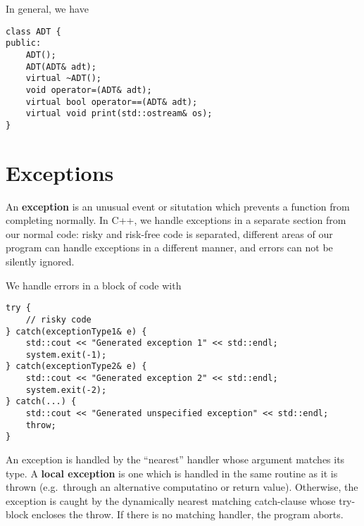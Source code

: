 \documentclass[12pt]{article}
\begin{document}
In general, we have
\begin{verbatim}
class ADT {
public:
    ADT();
    ADT(ADT& adt);
    virtual ~ADT();
    void operator=(ADT& adt);
    virtual bool operator==(ADT& adt);
    virtual void print(std::ostream& os);
}
\end{verbatim}


\section{Exceptions}

An {\bf exception} is an unusual event or situtation which prevents a function from completing normally. In C++, we handle exceptions in a separate section from our normal code: risky and risk-free code is separated, different areas of our program can handle exceptions in a different manner, and errors can not be silently ignored.

We handle errors in a block of code with
\begin{verbatim}
try {
    // risky code
} catch(exceptionType1& e) {
    std::cout << "Generated exception 1" << std::endl;
    system.exit(-1);
} catch(exceptionType2& e) {
    std::cout << "Generated exception 2" << std::endl;
    system.exit(-2);
} catch(...) {
    std::cout << "Generated unspecified exception" << std::endl;
    throw;
}
\end{verbatim}

An exception is handled by the ``nearest'' handler whose argument matches its type. A {\bf local exception} is one which is handled in the same routine as it is thrown (e.g.\ through an alternative computatino or return value). Otherwise, the exception is caught by the dynamically nearest matching catch-clause whose try-block encloses the throw. If there is no matching handler, the program aborts.
\end{document}

